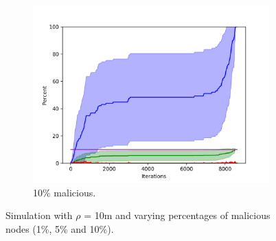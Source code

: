 \begin{figure}
\begin{subfigure}{0.6\textwidth}
\includegraphics[width=\linewidth]{images/plots/Network_rA/10_10.png}
\caption{10\% malicious.}
\end{subfigure}

\caption{Simulation with $\rho$ = 10m and varying percentages of malicious nodes (1\%, 5\% and 10\%).}
\label{fig:randommalicious1}
\end{figure}

